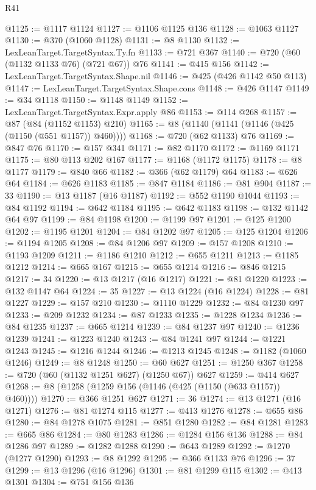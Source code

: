 \begin{lexlean}{R41}
\begin{coremodule}
{{{{{{{{{{{{{{{{{{{{{{{{{{{{{{{{{{{{{{{{{{{{{{{{{{{{{{{{{{{{{{{{{{{{{{{{{{{{{{{{{{{{{{{@1125 := @1117 @1124
@1127 := @1106 @1125 @136
@1128 := @1063 @1127
@1130 := @370 (@1060 @1128)
@1131 := @8 @1130
@1132 := LexLeanTarget.TargetSyntax.Ty.fn
@1133 := @721 @367
@1140 := @720 (@60 (@1132 @1133 @76) (@721 @67)) @76
@1141 := @415 @156
@1142 := LexLeanTarget.TargetSyntax.Shape.nil
@1146 := @425 (@426 @1142 @50 @113)
@1147 := LexLeanTarget.TargetSyntax.Shape.cons
@1148 := @426 @1147
@1149 := @34 @1118
@1150 := @1148 @1149
@1152 := LexLeanTarget.TargetSyntax.Expr.apply @86
@1153 := @114 @268
@1157 := @87 (@84 (@1152 @1153) @210)
@1165 := @8 (@1140 (@1141 (@1146 (@425 (@1150 (@551 @1157)) @460))))
@1168 := @720 (@62 @1133) @76
@1169 := @847 @76
@1170 := @157 @341
@1171 := @82 @1170
@1172 := @1169 @1171
@1175 := @80 @113 @202 @167
@1177 := @1168 (@1172 @1175)
@1178 := @8 @1177
@1179 := @840 @66
@1182 := @366 (@62 @1179) @64
@1183 := @626 @64
@1184 := @626 @1183
@1185 := @847 @1184
@1186 := @81 @904
@1187 := 33
@1190 := @13 @1187 (@16 @1187)
@1192 := @552 @1190 @1044
@1193 := @84 @1192
@1194 := @642 @1184
@1195 := @642 @1183
@1198 := @132 @1142 @64 @97
@1199 := @84 @1198
@1200 := @1199 @97
@1201 := @125 @1200
@1202 := @1195 @1201
@1204 := @84 @1202 @97
@1205 := @125 @1204
@1206 := @1194 @1205
@1208 := @84 @1206 @97
@1209 := @157 @1208
@1210 := @1193 @1209
@1211 := @1186 @1210
@1212 := @655 @1211
@1213 := @1185 @1212
@1214 := @665 @167
@1215 := @655 @1214
@1216 := @846 @1215
@1217 := 34
@1220 := @13 @1217 (@16 @1217)
@1221 := @81 @1220
@1223 := @132 @1147 @64
@1224 := 35
@1227 := @13 @1224 (@16 @1224)
@1228 := @81 @1227
@1229 := @157 @210
@1230 := @1110 @1229
@1232 := @84 @1230 @97
@1233 := @209 @1232
@1234 := @87 @1233
@1235 := @1228 @1234
@1236 := @84 @1235
@1237 := @665 @1214
@1239 := @84 @1237 @97
@1240 := @1236 @1239
@1241 := @1223 @1240
@1243 := @84 @1241 @97
@1244 := @1221 @1243
@1245 := @1216 @1244
@1246 := @1213 @1245
@1248 := @1182 (@1060 @1246)
@1249 := @8 @1248
@1250 := @60 @627
@1251 := @1250 @367
@1258 := @720 (@60 (@1132 @1251 @627) (@1250 @67)) @627
@1259 := @414 @627
@1268 := @8 (@1258 (@1259 @156 (@1146 (@425 (@1150 (@633 @1157)) @460))))
@1270 := @366 @1251 @627
@1271 := 36
@1274 := @13 @1271 (@16 @1271)
@1276 := @81 @1274 @115
@1277 := @413 @1276
@1278 := @655 @86
@1280 := @84 @1278 @1075
@1281 := @851 @1280
@1282 := @84 @1281
@1283 := @665 @86
@1284 := @80 @1283
@1286 := @1284 @156 @136
@1288 := @84 @1286 @97
@1289 := @1282 @1288
@1290 := @643 @1289
@1292 := @1270 (@1277 @1290)
@1293 := @8 @1292
@1295 := @366 @1133 @76
@1296 := 37
@1299 := @13 @1296 (@16 @1296)
@1301 := @81 @1299 @115
@1302 := @413 @1301
@1304 := @751 @156 @136
}}}}}}}}}}}}}}}}}}}}}}}}}}}}}}}}}}}}}}}}}}}}}}}}}}}}}}}}}}}}}}}}}}}}}}}}}}}}}}}}}}}}}}}
\end{coremodule}
\end{lexlean}
